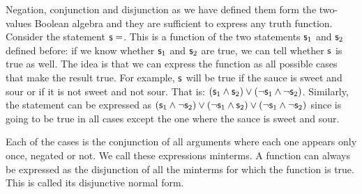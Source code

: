 \documentclass[11pt,letterpaper,fleqn]{memoir} %
\begin{document}
Negation, conjunction and disjunction as we have defined them form the two-values Boolean algebra and they are sufficient to express any truth function. Consider the statement $\mathsf{s}=$. This is a function of the two statements $\mathsf{s}_1$ and $\mathsf{s}_2$ defined before: if we know whether $\mathsf{s}_1$ and $\mathsf{s}_2$ are true, we can tell whether $\mathsf{s}$ is true as well. The idea is that we can express the function as all possible cases that make the result true. For example, $\mathsf{s}$ will be true if the sauce is sweet and sour or if it is not sweet and not sour. That is: $(\mathsf{s}_1 \wedge \mathsf{s}_2) \vee (\neg \mathsf{s}_1 \wedge \neg \mathsf{s}_2)$. Similarly, the statement  can be expressed as $(\mathsf{s}_1 \wedge \neg \mathsf{s}_2) \vee (\neg \mathsf{s}_1 \wedge \mathsf{s}_2) \vee (\neg \mathsf{s}_1 \wedge \neg \mathsf{s}_2)$ since is going to be true in all cases except the one where the sauce is sweet and sour.

Each of the cases is the conjunction of all arguments where each one appears only once, negated or not. We call these expressions minterms. A function can always be expressed as the disjunction of all the minterms for which the function is true. This is called its disjunctive normal form.%
\end{document}
